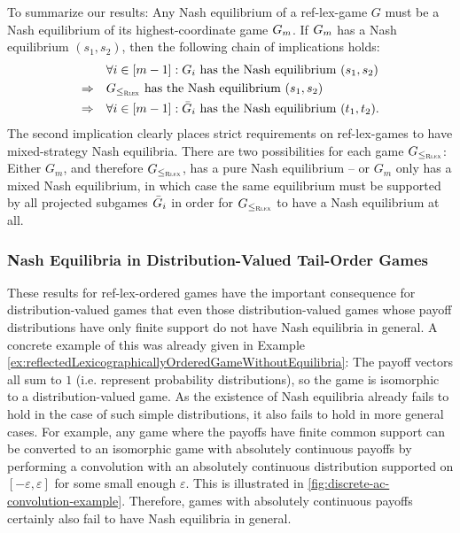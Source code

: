 \documentclass[a4paper,DIV=11,abstracton,twoside=semi]{scrreprt}
\let\epsilon\varepsilon
\theoremstyle{definition}
\begin{document}
    To summarize our results: Any Nash equilibrium of a ref-lex-game $G$ must be a Nash equilibrium of its highest-coordinate game $G_{m}$.
    If $G_{m}$ has a Nash equilibrium $(s_1, s_2)$, then the following chain of implications holds:
    \begin{align*}
         &\forall i \in [m - 1]: G_{i} \text{ has the Nash equilibrium } (s_1, s_2) \\
         \Rightarrow\quad &G_{\leq_{\textsc{Rlex}}} \text{ has the Nash equilibrium } (s_1, s_2) \\
         \Rightarrow\quad &\forall i \in [m-1]: \bar{G}_{i} \text{ has the Nash equilibrium } (t_1, t_2).
    \end{align*}
    The second implication clearly places strict requirements on ref-lex-games to have mixed-strategy Nash equilibria. There are two possibilities for each game $G_{\leq_{\textsc{Rlex}}}$: Either $G_m$, and therefore $G_{\leq_{\textsc{Rlex}}}$, has a pure Nash equilibrium -- or $G_m$ only has a mixed Nash equilibrium, in which case the same equilibrium must be supported by all projected subgames $\bar{G}_{i}$ in order for $G_{\leq_{\textsc{Rlex}}}$ to have a Nash equilibrium at all.
    
    
    \subsubsection{Nash Equilibria in Distribution-Valued Tail-Order Games}
    These results for ref-lex-ordered games have the important consequence for distribution-valued games that even those distribution-valued games whose payoff distributions have only finite support do not have Nash equilibria in general.
    A concrete example of this was already given in Example \ref{ex:reflectedLexicographicallyOrderedGameWithoutEquilibria}: The payoff vectors all sum to $1$ (i.e. represent probability distributions), so the game is isomorphic to a distribution-valued game.
    As the existence of Nash equilibria already fails to hold in the case of such simple distributions, it also fails to hold in more general cases.
    For example, any game where the payoffs have finite common support can be converted to an isomorphic game with absolutely continuous payoffs by performing a convolution with an absolutely continuous distribution supported on $[-\epsilon, \epsilon]$ for some small enough $\epsilon$.
    This is illustrated in \autoref{fig:discrete-ac-convolution-example}.
    Therefore, games with absolutely continuous payoffs certainly also fail to have Nash equilibria in general.
    
\end{document}
